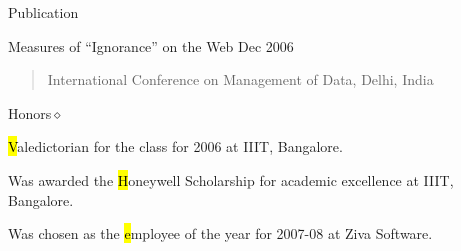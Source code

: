 \documentclass{resume}
\begin{document}
\begin{category}{Publication}{}

    \item {\topic Measures of ``Ignorance'' on the Web}
        {\period Dec 2006}
        \begin{quote}
            International Conference on Management of Data, Delhi, India
        \end{quote}

\end{category}


\begin{category}{Honors}{$\diamond$}

    \item {\hl Valedictorian} for the class for 2006 at IIIT, Bangalore.

    \item Was awarded the {\hl Honeywell Scholarship} for academic excellence
        at IIIT, Bangalore.

    \item Was chosen as the {\hl employee of the year} for 2007-08 at Ziva
        Software.

\end{category}
\end{document}
